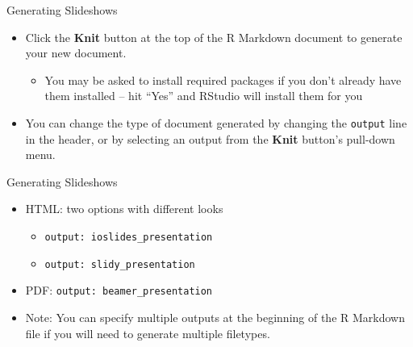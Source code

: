 \documentclass[
  ignorenonframetext,
]{beamer}
\providecommand{\tightlist}{%
  \setlength{\itemsep}{0pt}\setlength{\parskip}{0pt}}
\begin{document}
\begin{frame}[fragile]{Generating Slideshows}
\protect\hypertarget{generating-slideshows}{}
\begin{itemize}
\tightlist
\item
  Click the \textbf{Knit} button at the top of the R Markdown document
  to generate your new document.

  \begin{itemize}
  \tightlist
  \item
    You may be asked to install required packages if you don't already
    have them installed -- hit ``Yes'' and RStudio will install them for
    you
  \end{itemize}
\item
  You can change the type of document generated by changing the
  \texttt{output} line in the header, or by selecting an output from the
  \textbf{Knit} button's pull-down menu.
\end{itemize}
\end{frame}

\begin{frame}[fragile]{Generating Slideshows}
\protect\hypertarget{generating-slideshows-1}{}
\begin{itemize}
\tightlist
\item
  HTML: two options with different looks

  \begin{itemize}
  \tightlist
  \item
    \texttt{output:\ ioslides\_presentation}
  \item
    \texttt{output:\ slidy\_presentation}
  \end{itemize}
\item
  PDF: \texttt{output:\ beamer\_presentation}\\
\item
  Note: You can specify multiple outputs at the beginning of the R
  Markdown file if you will need to generate multiple filetypes.
\end{itemize}
\end{frame}
\end{document}
